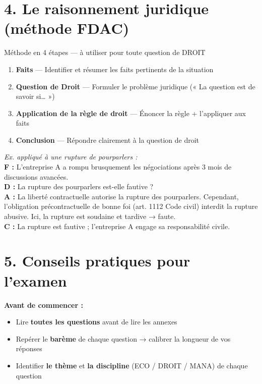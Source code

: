 \documentclass[11pt,a4paper]{article}
\begin{document}
\section*{\textcolor{mainColor}{4. Le raisonnement juridique (méthode FDAC)}}

\begin{methbox}{Méthode en 4 étapes — à utiliser pour toute question de DROIT}

\begin{enumerate}
  \item[\textbf{F}] \textbf{Faits} — Identifier et résumer les faits pertinents de la situation
  \item[\textbf{D}] \textbf{Question de Droit} — Formuler le problème juridique (« La question est de savoir si… »)
  \item[\textbf{A}] \textbf{Application de la règle de droit} — Énoncer la règle + l'appliquer aux faits
  \item[\textbf{C}] \textbf{Conclusion} — Répondre clairement à la question de droit
\end{enumerate}

\textit{Ex. appliqué à une rupture de pourparlers :}\\
\textbf{F :} L'entreprise A a rompu brusquement les négociations après 3 mois de discussions avancées.\\
\textbf{D :} La rupture des pourparlers est-elle fautive ?\\
\textbf{A :} La liberté contractuelle autorise la rupture des pourparlers. Cependant, l'obligation précontractuelle de bonne foi (art. 1112 Code civil) interdit la rupture abusive. Ici, la rupture est soudaine et tardive → faute.\\
\textbf{C :} La rupture est fautive ; l'entreprise A engage sa responsabilité civile.

\end{methbox}

\section*{\textcolor{mainColor}{5. Conseils pratiques pour l'examen}}

\begin{tipbox}
\textbf{Avant de commencer :}
\begin{itemize}
  \item Lire \textbf{toutes les questions} avant de lire les annexes
  \item Repérer le \textbf{barème} de chaque question → calibrer la longueur de vos réponses
  \item Identifier \textbf{le thème} et \textbf{la discipline} (ECO / DROIT / MANA) de chaque question
\end{itemize}
\end{tipbox}
\end{document}
